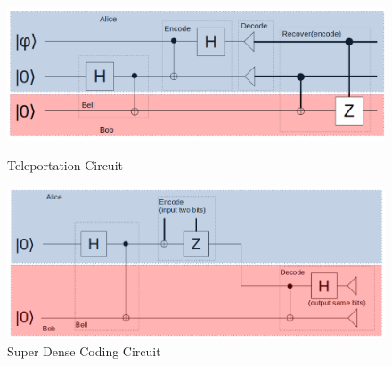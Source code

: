 \begin{figure}[t]
{\centering
\hspace*{-1.2em}
\hfill
\begin{minipage}[b]{.54\textwidth}
                 \includegraphics[width=1\textwidth]{tele_circuit.png}
            \caption{Teleportation Circuit}
            \label{fig:background-circuit-examplea}
 \end{minipage}
%
\begin{minipage}[b]{.46\textwidth}
                 \includegraphics[width=1\textwidth]{superdense.png}
            \caption{Super Dense Coding Circuit}
            \label{fig:background-circuit-exampleb}
 \end{minipage}
}
\end{figure}

